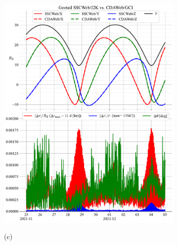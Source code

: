 \documentclass[draft]{agujournal2019}
\begin{document}
\begin{figure}[h]
\begin{subfigure}[b]{0.49\textwidth}
         \includegraphics[width=\textwidth]{figures/Geotail_SSCWeb-J2K_vs_CDAWeb-GCI.pdf}
     \end{subfigure}
     \par\bigskip\bigskip
     \begin{subfigure}[b]{0.49\textwidth}
         (c)
         \centering

\end{subfigure}
\end{figure}
\end{document}
